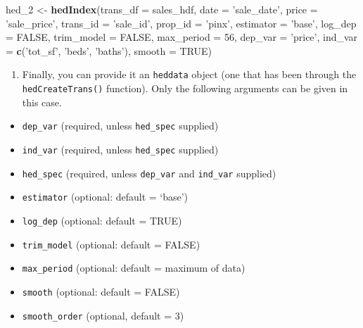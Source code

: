 \documentclass[]{article}
\newenvironment{Shaded}{\begin{snugshade}}{\end{snugshade}}
\newcommand{\KeywordTok}[1]{\textcolor[rgb]{0.13,0.29,0.53}{\textbf{#1}}}
\newcommand{\DataTypeTok}[1]{\textcolor[rgb]{0.13,0.29,0.53}{#1}}
\newcommand{\DecValTok}[1]{\textcolor[rgb]{0.00,0.00,0.81}{#1}}
\newcommand{\StringTok}[1]{\textcolor[rgb]{0.31,0.60,0.02}{#1}}
\newcommand{\OtherTok}[1]{\textcolor[rgb]{0.56,0.35,0.01}{#1}}
\newcommand{\NormalTok}[1]{#1}
\providecommand{\tightlist}{%
  \setlength{\itemsep}{0pt}\setlength{\parskip}{0pt}}
\begin{document}
\begin{Shaded}
\begin{Highlighting}[]
\NormalTok{  hed_}\DecValTok{2}\NormalTok{ <-}\StringTok{ }\KeywordTok{hedIndex}\NormalTok{(}\DataTypeTok{trans_df =}\NormalTok{ sales_hdf,}
                    \DataTypeTok{date =} \StringTok{'sale_date'}\NormalTok{,}
                    \DataTypeTok{price =} \StringTok{'sale_price'}\NormalTok{,}
                    \DataTypeTok{trans_id =} \StringTok{'sale_id'}\NormalTok{,}
                    \DataTypeTok{prop_id =} \StringTok{'pinx'}\NormalTok{,}
                    \DataTypeTok{estimator =} \StringTok{'base'}\NormalTok{,}
                    \DataTypeTok{log_dep =} \OtherTok{FALSE}\NormalTok{,}
                    \DataTypeTok{trim_model =} \OtherTok{FALSE}\NormalTok{,}
                    \DataTypeTok{max_period =} \DecValTok{56}\NormalTok{,}
                    \DataTypeTok{dep_var =} \StringTok{'price'}\NormalTok{,}
                    \DataTypeTok{ind_var =} \KeywordTok{c}\NormalTok{(}\StringTok{'tot_sf'}\NormalTok{, }\StringTok{'beds'}\NormalTok{, }\StringTok{'baths'}\NormalTok{),}
                    \DataTypeTok{smooth =} \OtherTok{TRUE}\NormalTok{)}
\end{Highlighting}
\end{Shaded}

\begin{enumerate}
\def\labelenumi{\arabic{enumi}.}
\setcounter{enumi}{2}
\tightlist
\item
  Finally, you can provide it an \texttt{heddata} object (one that has
  been through the \texttt{hedCreateTrans()} function). Only the
  following arguments can be given in this case.
\end{enumerate}

\begin{itemize}
\tightlist
\item
  \texttt{dep\_var} (required, unless \texttt{hed\_spec} supplied)
\item
  \texttt{ind\_var} (required, unless \texttt{hed\_spec} supplied)
\item
  \texttt{hed\_spec} (required, unless \texttt{dep\_var} and
  \texttt{ind\_var} supplied)
\item
  \texttt{estimator} (optional: default = `base')
\item
  \texttt{log\_dep} (optional: default = TRUE)
\item
  \texttt{trim\_model} (optional: default = FALSE)
\item
  \texttt{max\_period} (optional: default = maximum of data)
\item
  \texttt{smooth} (optional: default = FALSE)
\item
  \texttt{smooth\_order} (optional, default = 3)
\end{itemize}
\end{document}
